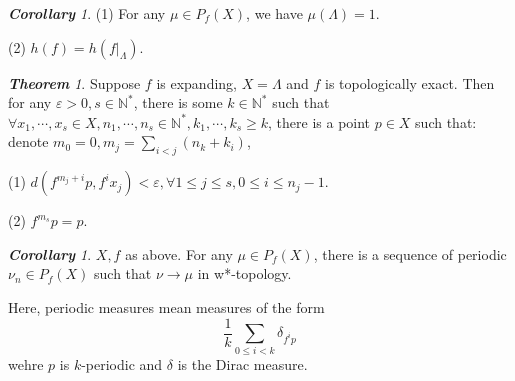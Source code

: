 \documentclass[10pt, a4paper, oneside]{report}
\numberwithin{equation}{chapter}
\theoremstyle{remark}
\newtheorem{theorem}[definition]{\bf{Theorem}}
\newtheorem{corollary}[definition]{\bf{Corollary}}
\theoremstyle{remark}
\begin{document}
\begin{corollary}
    (1) For any $\mu\in P_f(X)$, we have $\mu(\Lambda)=1$.

    (2) $h(f)=h(f|_\Lambda)$.
\end{corollary}

\begin{theorem}
    Suppose $f$ is expanding, $X=\Lambda$ and $f$ is topologically exact. Then for any $\varepsilon>0,s\in\mathbb{N}^*$, there is some $k\in\mathbb{N}^*$ such that $\forall x_1,\cdots,x_s\in X,n_1,\cdots,n_s\in\mathbb{N}^*,k_1,\cdots,k_s\geqslant k$,
    there is a point $p\in X$ such that: denote $m_0=0,m_j=\sum\limits_{i<j}(n_k+k_i)$,

    (1) $d(f^{m_j+i}p,f^ix_j)<\varepsilon,\forall 1\leqslant j\leqslant s,0\leqslant i\leqslant n_j-1$.

    (2) $f^{m_s}p=p$.
\end{theorem}

\begin{corollary}
    $X,f$ as above. For any $\mu\in P_f(X)$, there is a sequence of periodic $\nu_n\in P_f(X)$ such that $\nu\to \mu$ in w*-topology.

    Here, periodic measures mean measures of the form $$\frac{1}{k}\sum\limits_{0\leqslant i<k}\delta_{f^ip}$$ wehre $p$ is $k$-periodic and $\delta$ is the Dirac measure.
\end{corollary}
\end{document}
